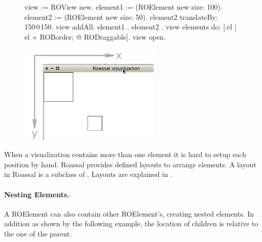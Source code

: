 \documentclass[a4paper,10pt,twoside]{book}
\begin{document}
\begin{figure}[H]
      \begin{minipage}[t]{0.5\textwidth}
      \vspace{0pt}
\begin{code}{}
view := ROView new.
element1 := (ROElement new size: 100).
element2 := (ROElement new size: 50).
element2 translateBy: 150@150.
view addAll: { element1 . element2 }.
view elements do: [:el | el + ROBorder; @ RODraggable].
view open.
\end{code}
   \end{minipage}
   \hfill
   \begin{minipage}[t]{0.6\textwidth}
      \vspace{0pt} \raggedright
       \centering
		\includegraphics[width=0.6\textwidth]{ex4}
   \end{minipage}
\label{fig:ex4}
\end{figure}


When a visualization contains more than one element it is hard to setup each position by hand. Roassal provides defined layouts to arrange elements. A layout in Roassal is a subclass of . Layouts are explained in  .


\paragraph{Nesting Elements.}
A ROElement can also contain other ROElement's, creating nested elements. In addition as shown by the following example, the location of children is relative to the one of the parent. %
\end{document}
